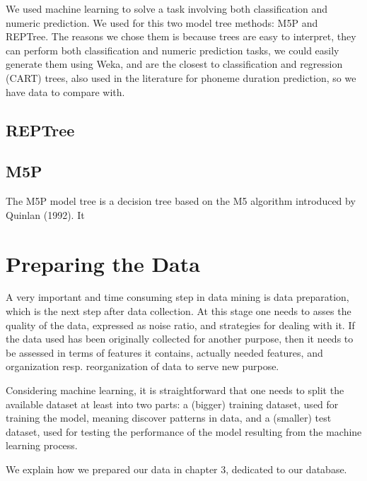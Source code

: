 \documentclass[a4paper]{scrreprt}
\begin{document}
We used machine learning to solve a task involving both classification and numeric prediction. We used for this two model tree methods: M5P and REPTree. The reasons we chose them is because trees are easy to interpret, they can perform both classification and numeric prediction tasks, we could easily generate them using Weka, and are the closest to classification and regression (CART) trees, also used in the literature \cite{Brinckmann2003} for phoneme duration prediction, so we have data to compare with.

\subsection{REPTree}


\subsection{M5P}
The M5P model tree is a decision tree based on the M5 algorithm introduced by Quinlan (1992). It 

\section{Preparing the Data}
A very important and time consuming step in data mining is data preparation, which is the next step after data collection. At this stage one needs to asses the quality of the data, expressed as noise ratio, and strategies for dealing with it. If the data used has been originally collected for another purpose, then it needs to be assessed in terms of features it contains, actually needed features, and organization resp. reorganization of data to serve new purpose. 

Considering machine learning, it is straightforward that one needs to split the available dataset at least into two parts: a (bigger) training dataset, used for training the model, meaning discover patterns in data, and a (smaller) test dataset, used for testing the performance of the model resulting from the machine learning process. 

We explain how we prepared our data in chapter 3, dedicated to our database.
\end{document}
